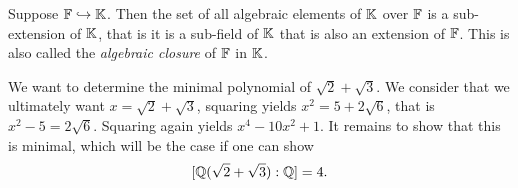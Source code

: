 \begin{corollary}
    Suppose $\mathbb{F} \hookrightarrow \mathbb{K}$. Then the set of all algebraic elements of $\mathbb{K}$ over $\mathbb{F}$ is a sub-extension of $\mathbb{K}$, that is it is a sub-field of $\mathbb{K}$ that is also an extension of $\mathbb{F}$. This is also called the \emph{algebraic closure} of $\mathbb{F}$ in $\mathbb{K}$.
\end{corollary}

\begin{example}
    We want to determine the minimal polynomial of $\sqrt{2} + \sqrt{3}$. We consider that we ultimately want $x = \sqrt{2} + \sqrt{3}$, squaring yields $x^2 = 5 + 2 \sqrt{6}$, that is $x^2 - 5 = 2 \sqrt{6}$. Squaring again yields $x^4 - 10x^2 + 1$. It remains to show that this is minimal, which will be the case if one can show
    \[
        [\mathbb{Q}(\sqrt{2} + \sqrt{3}) : \mathbb{Q}] = 4.
    \]
\end{example}